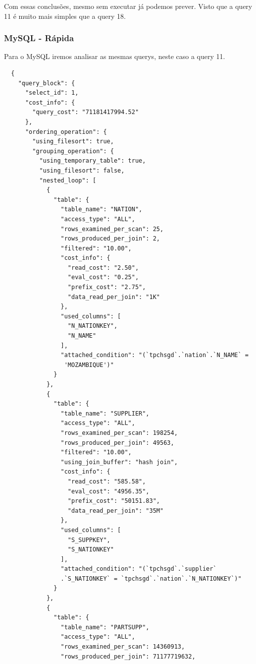 \documentclass{article}
\begin{document}
Com essas conclusões, mesmo sem executar já podemos prever. Visto que a query 11 é muito mais simples que a query 18.



\subsubsection{MySQL - Rápida}
\texttt{}\par Para o MySQL iremos analisar as mesmas querys, neste caso a query 11.
\begin{lstlisting}
  {
    "query_block": {
      "select_id": 1,
      "cost_info": {
        "query_cost": "71181417994.52"
      },
      "ordering_operation": {
        "using_filesort": true,
        "grouping_operation": {
          "using_temporary_table": true,
          "using_filesort": false,
          "nested_loop": [
            {
              "table": {
                "table_name": "NATION",
                "access_type": "ALL",
                "rows_examined_per_scan": 25,
                "rows_produced_per_join": 2,
                "filtered": "10.00",
                "cost_info": {
                  "read_cost": "2.50",
                  "eval_cost": "0.25",
                  "prefix_cost": "2.75",
                  "data_read_per_join": "1K"
                },
                "used_columns": [
                  "N_NATIONKEY",
                  "N_NAME"
                ],
                "attached_condition": "(`tpchsgd`.`nation`.`N_NAME` =
                 'MOZAMBIQUE')"
              }
            },
            {
              "table": {
                "table_name": "SUPPLIER",
                "access_type": "ALL",
                "rows_examined_per_scan": 198254,
                "rows_produced_per_join": 49563,
                "filtered": "10.00",
                "using_join_buffer": "hash join",
                "cost_info": {
                  "read_cost": "585.58",
                  "eval_cost": "4956.35",
                  "prefix_cost": "50151.83",
                  "data_read_per_join": "35M"
                },
                "used_columns": [
                  "S_SUPPKEY",
                  "S_NATIONKEY"
                ],
                "attached_condition": "(`tpchsgd`.`supplier`
                .`S_NATIONKEY` = `tpchsgd`.`nation`.`N_NATIONKEY`)"
              }
            },
            {
              "table": {
                "table_name": "PARTSUPP",
                "access_type": "ALL",
                "rows_examined_per_scan": 14360913,
                "rows_produced_per_join": 71177719632,

\end{lstlisting}
\end{document}

